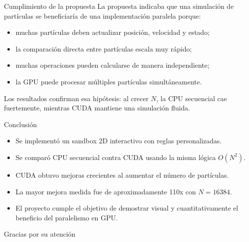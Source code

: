 \documentclass[aspectratio=169]{beamer}
\begin{document}
\begin{frame}{Cumplimiento de la propuesta}
    La propuesta indicaba que una simulación de partículas se beneficiaría de una implementación paralela porque:

    \begin{itemize}
        \item muchas partículas deben actualizar posición, velocidad y estado;
        \item la comparación directa entre partículas escala muy rápido;
        \item muchas operaciones pueden calcularse de manera independiente;
        \item la GPU puede procesar múltiples partículas simultáneamente.
    \end{itemize}

    \vspace{0.3cm}

    Los resultados confirman esa hipótesis: al crecer $N$, la CPU secuencial cae fuertemente, mientras CUDA mantiene una simulación fluida.
\end{frame}

\begin{frame}{Conclusión}
    \begin{itemize}
        \item Se implementó un sandbox 2D interactivo con reglas personalizadas.
        \item Se comparó CPU secuencial contra CUDA usando la misma lógica $O(N^2)$.
        \item CUDA obtuvo mejoras crecientes al aumentar el número de partículas.
        \item La mayor mejora medida fue de aproximadamente 110x con $N = 16384$.
        \item El proyecto cumple el objetivo de demostrar visual y cuantitativamente el beneficio del paralelismo en GPU.
    \end{itemize}
\end{frame}

\begin{frame}
    \centering
    \vspace{1.0cm}
    {\Huge Gracias por su atención}
\end{frame}
\end{document}
